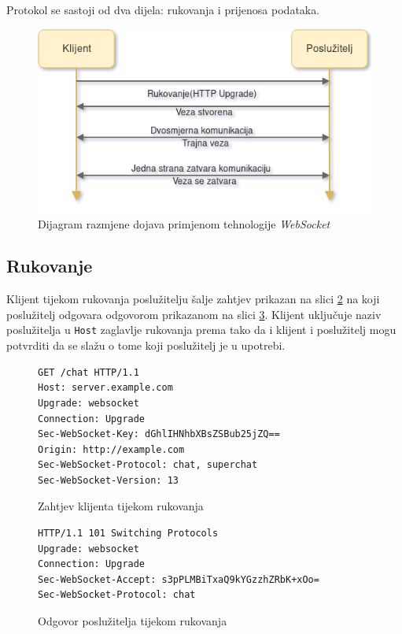 \documentclass[times, utf8, zavrsni]{fer}
\begin{document}
{Protokol se sastoji od dva dijela: rukovanja i prijenosa podataka. \citep{rfc6455}

\begin{figure}[htb]
\centering
\includegraphics[width=\linewidth]{img/websocket.png}
\caption{Dijagram razmjene dojava primjenom tehnologije {\em WebSocket}}
\label{fig:websocket-image}
\end{figure}

\subsection{Rukovanje}
Klijent tijekom rukovanja poslužitelju šalje zahtjev prikazan na slici \ref{lst:websocket-rukovanje-1} na koji poslužitelj odgovara odgovorom prikazanom na slici \ref{lst:websocket-rukovanje-2}. Klijent uključuje naziv poslužitelja u {\tt Host} zaglavlje rukovanja prema tako da i klijent i poslužitelj mogu potvrditi da se slažu o tome koji poslužitelj je u upotrebi.

\begin{figure}
\begin{lstlisting}
GET /chat HTTP/1.1
Host: server.example.com
Upgrade: websocket
Connection: Upgrade
Sec-WebSocket-Key: dGhlIHNhbXBsZSBub25jZQ==
Origin: http://example.com
Sec-WebSocket-Protocol: chat, superchat
Sec-WebSocket-Version: 13
\end{lstlisting}
\caption{Zahtjev klijenta tijekom rukovanja}
\label{lst:websocket-rukovanje-1}
\end{figure}

\begin{figure}
\begin{lstlisting}
HTTP/1.1 101 Switching Protocols
Upgrade: websocket
Connection: Upgrade
Sec-WebSocket-Accept: s3pPLMBiTxaQ9kYGzzhZRbK+xOo=
Sec-WebSocket-Protocol: chat
\end{lstlisting}
\caption{Odgovor poslužitelja tijekom rukovanja}
\label{lst:websocket-rukovanje-2}
\end{figure}

}
\end{document}
